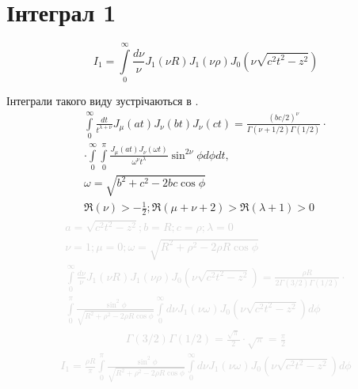\section{Інтеграл 1}
%
\begin{equation} \label{eq:int1start}
I_1 = \int\limits_{0}^{\infty} \frac{d\nu}{\nu} 
J_1 \left( \nu R \right) J_1 \left( \nu \rho \right) 
J_0 \left( \nu \sqrt{c^2 t^2 - z^2} \right)
\end{equation}

Інтеграли такого виду зустрічаються в \cite[ст. 398]{Watson1922}.
\begin{equation} \begin{aligned} \label{eq:intJJJtable}
\int\limits_{0}^{\infty} \frac{d t}{t^{\lambda + \nu}} 
J_\mu \left( at \right) J_\nu \left( bt \right) J_\nu \left( ct \right) =
\frac{ \left( bc/2 \right) ^\nu }
{ \Gamma \left( \nu + 1/2 \right) \Gamma \left( 1/2 \right) } \cdot \\
\cdot \int\limits_{0}^{\infty} \int\limits_{0}^{\pi}
\frac{J_\mu \left( at \right) J_\nu \left( \omega t \right)}
{\omega^\nu t^\lambda} \sin^{2\nu}{\phi} d\phi dt, \\
\omega = \sqrt{b^2 + c^2 - 2bc \cos \phi} \\
\Re \left( \nu \right) > - \frac{1}{2};
\Re \left( \mu + \nu + 2 \right) > \Re \left( \lambda + 1 \right) > 0
\end{aligned} \end{equation}
%
\textcolor{lightgray}{ \begin{equation*} \begin{aligned}
a = \sqrt{c^2 t^2 - z^2}; b = R; c = \rho; \lambda = 0 \\
\nu = 1; \mu = 0; \omega = \sqrt{R^2 + \rho^2 - 2 \rho R \cos \phi} \\
\int\limits_{0}^{\infty} \frac{d\nu}{\nu} 
J_1 \left( \nu R \right) J_1 \left( \nu \rho \right) 
J_0 \left( \nu \sqrt{c^2 t^2 - z^2} \right) = 
\frac{\rho R}{ 2 \Gamma \left( 3/2 \right) \Gamma \left( 1/2 \right) } \cdot \\
\int\limits_{0}^{\pi} 
\frac{\sin^2{\phi}}{\sqrt{R^2 + \rho^2 - 2 \rho R \cos \phi}}
\int\limits_{0}^{\infty} d \nu J_1 \left( \nu \omega \right) 
J_0 \left( \nu \sqrt{c^2 t^2 - z^2} \right) d \phi
\end{aligned} \end{equation*} }
%
\textcolor{lightgray}{ \begin{equation*} \begin{aligned}
\Gamma \left( 3/2 \right) \Gamma \left( 1/2 \right) = 
\frac{\sqrt{\pi}}{2} \cdot \sqrt{\pi} = \frac{\pi}{2} 
\end{aligned} \end{equation*} }
%
\textcolor{lightgray}{ \begin{equation*} \begin{aligned}
I_1 = \frac{\rho R}{\pi} \int\limits_{0}^{\pi} 
\frac{\sin^2{\phi}}{\sqrt{R^2 + \rho^2 - 2 \rho R \cos \phi}}
\int\limits_{0}^{\infty} d \nu J_1 \left( \nu \omega \right) 
J_0 \left( \nu \sqrt{c^2 t^2 - z^2} \right) d \phi
\end{aligned} \end{equation*} }

